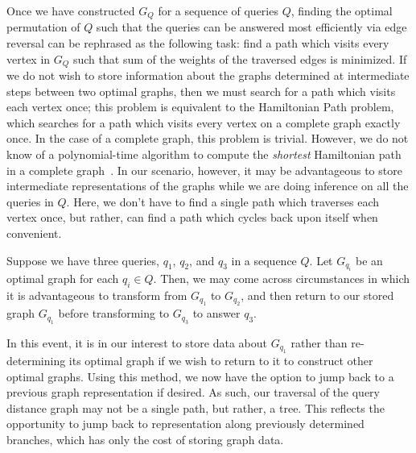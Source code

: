 \null \quad \quad Once we have constructed $G_{Q}$ for a sequence of queries $Q$, finding the optimal permutation of $Q$ such that the queries can be answered most efficiently via edge reversal can be rephrased as the following task: find a path which visits every vertex in $G_{Q}$ such that sum of the weights of the traversed edges is minimized.  \newline
\null \quad \quad If we do not wish to store information about the graphs determined at intermediate steps between two optimal graphs, then we must search for a path which visits each vertex once; this problem is equivalent to the Hamiltonian Path problem, which searches for a path which visits every vertex on a complete graph exactly once. In the case of a complete graph, this problem is trivial. However, we do not know of a polynomial-time algorithm to compute the \textit{shortest} Hamiltonian path in a complete graph~\cite{hamiltonianpath}. \newline
\null \quad \quad In our scenario, however, it may be advantageous to store intermediate representations of the graphs while we are doing inference on all the queries in $Q$. Here, we don't have to find a single path which traverses each vertex once, but rather, can find a path which cycles back upon itself when convenient.\newline
\begin{example}\label{ex:quicktree}
Suppose we have three queries, $q_{1}$, $q_{2}$, and $q_{3}$ in a sequence $Q$. Let $G_{q_{i}}$ be an optimal graph for each $q_{i} \in Q$. Then, we may come across circumstances in which it is advantageous to transform from $G_{q_{1}}$ to $G_{q_{2}}$, and then return to our stored graph $G_{q_{1}}$ before transforming to $G_{q_{3}}$ to answer $q_{3}$. 
\end{example}
\null \quad \quad In this event, it is in our interest to store data about $G_{q_{1}}$ rather than re-determining its optimal graph if we wish to return to it to construct other optimal graphs. Using this method, we now have the option to jump back to a previous graph representation if desired. As such, our traversal of the query distance graph may not be a single path, but rather, a tree. This reflects the opportunity to jump back to representation along previously determined branches, which has only the cost of storing graph data. 

